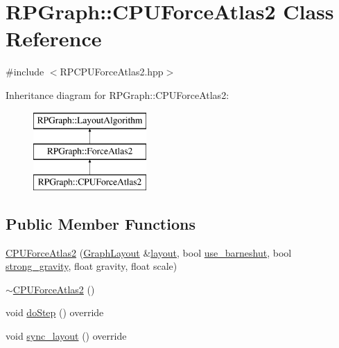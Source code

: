 \hypertarget{classRPGraph_1_1CPUForceAtlas2}{}\section{R\+P\+Graph\+:\+:C\+P\+U\+Force\+Atlas2 Class Reference}
\label{classRPGraph_1_1CPUForceAtlas2}


{\ttfamily \#include $<$R\+P\+C\+P\+U\+Force\+Atlas2.\+hpp$>$}

Inheritance diagram for R\+P\+Graph\+:\+:C\+P\+U\+Force\+Atlas2\+:\begin{figure}[H]
\begin{center}
\leavevmode
\includegraphics[height=3.000000cm]{classRPGraph_1_1CPUForceAtlas2}
\end{center}
\end{figure}
\subsection*{Public Member Functions}
\begin{DoxyCompactItemize}
\item 
\mbox{\hyperlink{classRPGraph_1_1CPUForceAtlas2_a5a17745426c0fcce430541f5b639282e}{C\+P\+U\+Force\+Atlas2}} (\mbox{\hyperlink{classRPGraph_1_1GraphLayout}{Graph\+Layout}} \&\mbox{\hyperlink{classRPGraph_1_1LayoutAlgorithm_ac2335a7ccaeb6cef789ea59b99353cf9}{layout}}, bool \mbox{\hyperlink{classRPGraph_1_1ForceAtlas2_a6ca74377ba79a67e4d1660c61426c090}{use\+\_\+barneshut}}, bool \mbox{\hyperlink{classRPGraph_1_1ForceAtlas2_afabfd0d83e05a54de889a62d0ff7595e}{strong\+\_\+gravity}}, float gravity, float scale)
\item 
\mbox{\hyperlink{classRPGraph_1_1CPUForceAtlas2_a0ea154bc6d1cca1dc47e4eda2152e0fe}{$\sim$\+C\+P\+U\+Force\+Atlas2}} ()
\item 
void \mbox{\hyperlink{classRPGraph_1_1CPUForceAtlas2_a3542ecd2220173aabe4e864fc21826eb}{do\+Step}} () override
\item 
void \mbox{\hyperlink{classRPGraph_1_1CPUForceAtlas2_afaada68053fce521843af0eb5ca316df}{sync\+\_\+layout}} () override
\end{DoxyCompactItemize}
